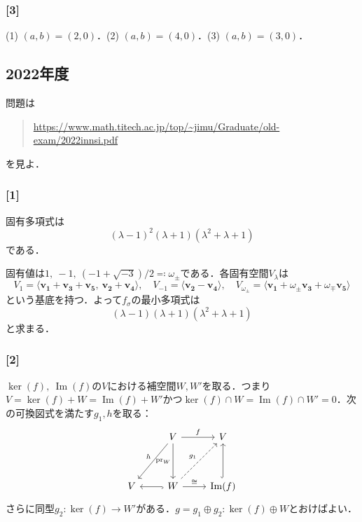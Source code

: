\documentclass[a4j]{ltjsarticle}
\newcommand{\1}{\mathbbm{1}}
\numberwithin{equation}{section}
\theoremstyle{definition}
\begin{document}
\subsubsection*{[3]}
(1) $(a,b)=(2,0)$．(2) $(a,b)=(4,0)$．(3) $(a,b)=(3,0)$．
\subsection{2022年度}
問題は
\begin{quote}
    \url{https://www.math.titech.ac.jp/top/~jimu/Graduate/old-exam/2022innsi.pdf}
\end{quote}
を見よ．
\subsubsection*{[1]}
固有多項式は
\begin{equation}
    (\lambda-1)^2(\lambda+1)(\lambda^2+\lambda+1)
\end{equation}
である．

固有値は$1,\ -1,\ (-1+\sqrt{-3})/2\eqcolon \omega_{\pm}$である．各固有空間$V_{\lambda}$は
\begin{equation}
    V_{1}=\langle\bm{v_1}+\bm{v_3}+\bm{v_5},\ \bm{v_2}+\bm{v_4}\rangle,\quad V_{-1}=\langle\bm{v_2}-\bm{v_4}\rangle,\quad V_{\omega_{\pm}}=\langle\bm{v_1}+\omega_{\pm}\bm{v_3}+\omega_{\mp}\bm{v_5}\rangle
\end{equation}
という基底を持つ．よって$f_\sigma$の最小多項式は
\begin{equation}
    (\lambda-1)(\lambda+1)(\lambda^2+\lambda+1)
\end{equation}
と求まる．
\subsubsection*{[2]}
$\ker(f),\ \mathop{\mathrm{Im}}(f)$の$V$における補空間$W,W'$を取る．つまり$V=\ker(f)+ W=\mathop{\mathrm{Im}}(f)+W'$かつ$\ker (f) \cap W=\mathop{\mathrm{Im}}(f)\cap W'=0$．次の可換図式を満たす$g_1,h$を取る：
\begin{equation}
    \begin{tikzcd}
      & V \arrow[dd, "\mathop{\mathrm{pr}}_{W}"'] \arrow[ldd, "h"'] \arrow[r, "f"] & V                                        \\
      &                                                                            &                                          \\
    V & W \arrow[l, hook] \arrow[r, "\cong"] \arrow[ruu, "g_1", dashed]            & \mathop{\mathrm{Im}}(f) \arrow[uu, hook]
    \end{tikzcd}
\end{equation}
さらに同型$g_2\colon \ker(f)\to W'$がある．$g=g_1\oplus g_2\colon \ker(f)\oplus W$とおけばよい．
\end{document}
